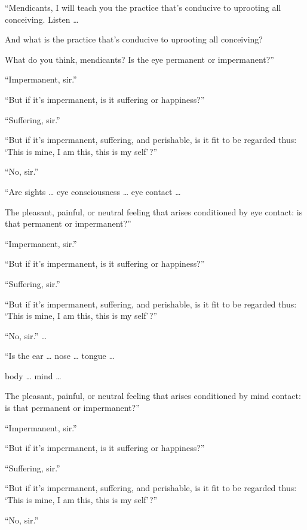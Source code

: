 \documentclass[12pt,openany]{book}%
\begin{document}
“Mendicants, I will teach you the practice that’s conducive to uprooting all conceiving. Listen … 

And what is the practice that’s conducive to uprooting all conceiving? 

What do you think, mendicants? Is the eye permanent or impermanent?” 

“Impermanent, sir.” 

“But if it’s impermanent, is it suffering or happiness?” 

“Suffering, sir.” 

“But if it’s impermanent, suffering, and perishable, is it fit to be regarded thus: ‘This is mine, I am this, this is my self’?” 

“No, sir.” 

“Are sights … eye consciousness … eye contact … 

The pleasant, painful, or neutral feeling that arises conditioned by eye contact: is that permanent or impermanent?” 

“Impermanent, sir.” 

“But if it’s impermanent, is it suffering or happiness?” 

“Suffering, sir.” 

“But if it’s impermanent, suffering, and perishable, is it fit to be regarded thus: ‘This is mine, I am this, this is my self’?” 

“No, sir.” … 

“Is the ear … nose … tongue … 

body … mind … 

The pleasant, painful, or neutral feeling that arises conditioned by mind contact: is that permanent or impermanent?” 

“Impermanent, sir.” 

“But if it’s impermanent, is it suffering or happiness?” 

“Suffering, sir.” 

“But if it’s impermanent, suffering, and perishable, is it fit to be regarded thus: ‘This is mine, I am this, this is my self’?” 

“No, sir.” 
\end{document}
